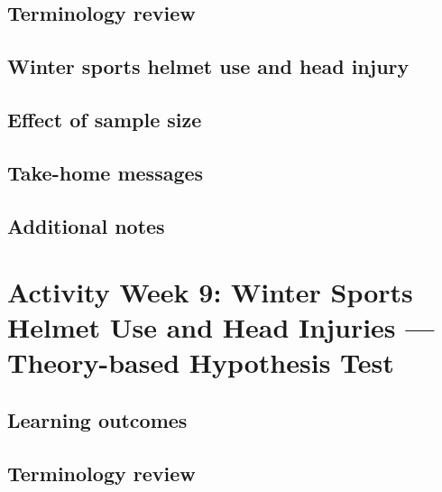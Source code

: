 \documentclass[
]{report}
\begin{document}
\hypertarget{terminology-review-15}{%
\subsection{Terminology review}\label{terminology-review-15}}

\hypertarget{winter-sports-helmet-use-and-head-injury}{%
\subsection{Winter sports helmet use and head injury}\label{winter-sports-helmet-use-and-head-injury}}

\hypertarget{effect-of-sample-size-1}{%
\subsection{Effect of sample size}\label{effect-of-sample-size-1}}

\hypertarget{take-home-messages-15}{%
\subsection{Take-home messages}\label{take-home-messages-15}}

\hypertarget{additional-notes-14}{%
\subsection{Additional notes}\label{additional-notes-14}}

\hypertarget{activity-week-9-winter-sports-helmet-use-and-head-injuries-theory-based-hypothesis-test}{%
\section{Activity Week 9: Winter Sports Helmet Use and Head Injuries --- Theory-based Hypothesis Test}\label{activity-week-9-winter-sports-helmet-use-and-head-injuries-theory-based-hypothesis-test}}

\hypertarget{learning-outcomes-18}{%
\subsection{Learning outcomes}\label{learning-outcomes-18}}

\hypertarget{terminology-review-16}{%
\subsection{Terminology review}\label{terminology-review-16}}
\end{document}
